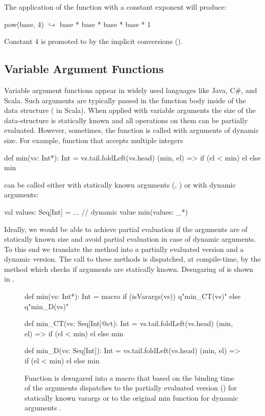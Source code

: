  The application of the function  with a constant
 exponent will produce:

\begin{lstparagraph}
pow(base, 4)
  $\hookrightarrow$ base * base * base * base * 1
\end{lstparagraph}

Constant 4 is promoted to  by the implicit conversions ().

\subsection{Variable Argument Functions}
\label{sct:varargs}

Variable argument functions appear in widely used languages like Java, C\#, and Scala.
 Such arguments are typically passed in the function body inside of the data structure
 (\eg {} in Scala). When applied with variable arguments the size of the
 data-structure is statically known and all operations on them can be partially
 evaluated. However, sometimes, the function is called with arguments of dynamic size.
 For example, function  that accepts multiple integers\begin{lstparagraph}
def min(vs: Int*): Int = vs.tail.foldLeft(vs.head) {
  (min, el) => if (el < min) el else min
}
\end{lstparagraph}can be called either with statically known arguments
 (\eg, ) or with dynamic arguments:\begin{lstparagraph}
val values: Seq[Int] = ... // dynamic value
min(values: _*)
\end{lstparagraph}

Ideally, we would be able to achieve partial evaluation if the arguments are of statically
known size and avoid partial evaluation in case of dynamic arguments. To this end we translate
the method  into a partially evaluated version and a dynamic version. The call to these
methods is dispatched, at compile-time, by the  method which checks if
arguments are statically known. Desugaring of  is shown in .

\begin{figure}
\begin{listing}
def min(vs: Int*): Int = macro
  if (isVarargs(vs)) q"min_CT(vs)"
  else q"min_D(vs)"

def min_CT(vs: Seq[Int]@ct): Int =
  vs.tail.foldLeft(vs.head) { (min, el) =>
    if (el < min) el else min
  }

def min_D(vs: Seq[Int]): Int =
  vs.tail.foldLeft(vs.head) {
    (min, el) => if (el < min) el else min
  }
\end{listing}
\caption{Function  is desugared into a  macro that based on the
binding time of the arguments dispatches to the partially evaluated version ()
for statically known varargs or to the original min function for dynamic arguments .}
\label{fig:min}
\end{figure}

